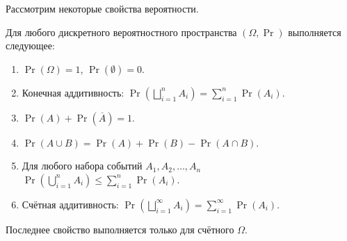 Рассмотрим некоторые свойства вероятности.
\begin{theorem}
    Для любого дискретного вероятностного пространства \((\Omega, \Pr)\) выполняется следующее:
    \begin{enumerate}
        \item \(\Pr(\Omega) = 1\), \(\Pr(\emptyset) = 0\).
        \item Конечная аддитивность: \(\Pr\left(\bigsqcup\limits_{i = 1}^{n} A_i\right) = \sum\limits_{i = 1}^{n} \Pr(A_i)\).
        \item \(\Pr(A) + \Pr(\overline{A}) = 1\).
        \item \(\Pr(A \cup B) = \Pr(A) + \Pr(B) - \Pr(A \cap B)\).
        \item Для любого набора событий \(A_1, A_2, \ldots, A_n\) \(\Pr\left(\bigcup\limits_{i = 1}^{n} A_i\right) \leq \sum\limits_{i = 1}^{n} \Pr(A_i)\).
        \item Счётная аддитивность: \(\Pr\left(\bigsqcup\limits_{i = 1}^{\infty} A_i\right) = \sum\limits_{i = 1}^{\infty} \Pr(A_i).\)
    \end{enumerate}
    Последнее свойство выполняется только для счётного \(\Omega\).
\end{theorem}
